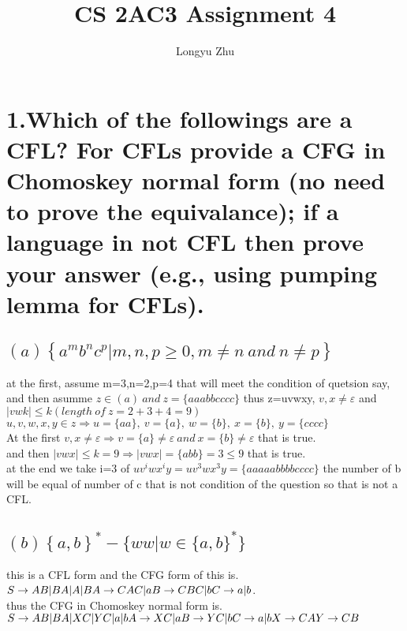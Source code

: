 \documentclass[12pt]{article}
\title{CS 2AC3 Assignment 4}
\author{Longyu Zhu}
\begin{document}
\section*{1.Which of the followings are a CFL? 
For CFLs provide a CFG in Chomoskey normal form 
(no need to prove the equivalance); if a language in not CFL then prove your answer (e.g., using pumping lemma for CFLs).}
\subsection*{ $\left(a\right) \left\{a^m b^n c^p | m,n,p\geq 0,m\neq n~and~n\neq p\right\}$ }
at the first, assume m=3,n=2,p=4 that will meet the condition of quetsion say, and then asumme $z\in \left(a\right)~ and ~z=\{aaabbcccc\}$ 
thus z=uvwxy, $v,x\neq\varepsilon$ and $|vwk|\leq k\left(length~of~z=2+3+4=9\right)$\\
$u,v,w,x,y\in z\Rightarrow u=\{aa\},~v=\{a\} ,~w=\{b\},~ x=\{b\}, ~y=\{cccc\}$\\
At the first $v,x\neq \varepsilon\Rightarrow v=\{a\}\neq \varepsilon~and~x=\{b\}\neq\varepsilon$ that is true.\\
and then $|vwx|\leq k=9 \Rightarrow|vwx|=\{abb\}=3\leq9$  that is true.\\
at the end we take i=3 of $uv^iwx^iy=uv^3wx^3y=\{aaaaabbbbcccc\}$ the number of b will be equal of number of c that is not condition of the question so that is not a CFL.\\



\subsection*{ $\left(b\right) \left\{ a,b\right\}^* - \{ ww|w\in \{ a,b\}^*\}$}
this is a CFL form and the CFG form of this is.\\
$S\rightarrow AB|BA|A|B\\
A\rightarrow CAC|a\\
B\rightarrow CBC|b\\
C\rightarrow a|b$.\\
thus the CFG in Chomoskey normal form is.\\
$S\rightarrow AB|BA|XC|YC|a|b\\
A\rightarrow XC|a\\
B\rightarrow YC|b\\
C\rightarrow a|b\\
X\rightarrow CA\\
Y\rightarrow CB$\\
\end{document}
